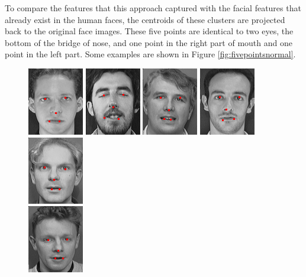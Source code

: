 To compare the features that this approach captured with the facial features that already exist in the human faces, the centroids of these clusters are projected back to the original face images. These five points are identical to two eyes, the bottom of the bridge of nose, and one point in the right part of mouth and one point in the left part. Some examples are shown in \mbox{Figure} \ref{fig:fivepointsnormal}. 
\begin{figure}[ht]
\begin{center}
 \includegraphics[width=0.15\columnwidth]{ch3/figures/kmeanresult1.png}
 \includegraphics[width=0.15\columnwidth]{ch3/figures/kmeanresult2.png}
 \includegraphics[width=0.15\columnwidth]{ch3/figures/kmeanresult3.png}
 \includegraphics[width=0.15\columnwidth]{ch3/figures/kmeanresult4.png}
 \includegraphics[width=0.15\columnwidth]{ch3/figures/kmeanresult5.png}\\
 \includegraphics[width=0.15\columnwidth]{ch3/figures/kmeanresult6.png}

\end{center}
\end{figure}
